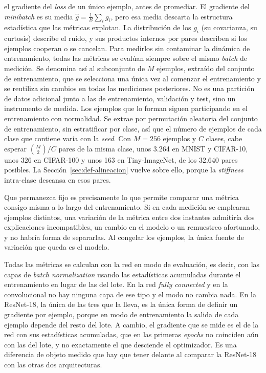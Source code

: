 el gradiente del \emph{loss} de un único ejemplo, antes de promediar. El gradiente del \emph{minibatch} es su media $\hat{g} = \tfrac{1}{B}\sum_i g_i$, pero esa media descarta la estructura estadística que las métricas explotan. La distribución de los $g_i$ (su covarianza, su curtosis) describe el ruido, y sus productos internos por pares describen si los ejemplos cooperan o se cancelan. Para medirlos sin contaminar la dinámica de entrenamiento, todas las métricas se evalúan siempre sobre el mismo \emph{batch} de medición. Se denomina así al subconjunto de $M$ ejemplos, extraído del conjunto de entrenamiento, que se selecciona una única vez al comenzar el entrenamiento y se reutiliza sin cambios en todas las mediciones posteriores. No es una partición de datos adicional junto a las de entrenamiento, validación y test, sino un instrumento de medida. Los ejemplos que lo forman siguen participando en el entrenamiento con normalidad. Se extrae por permutación aleatoria del conjunto de entrenamiento, sin estratificar por clase, así que el número de ejemplos de cada clase que contiene varía con la \emph{seed}. Con $M = 256$ ejemplos y $C$ clases, cabe esperar $\binom{M}{2}/C$ pares de la misma clase, unos 3.264 en MNIST y CIFAR-10, unos 326 en CIFAR-100 y unos 163 en Tiny-ImageNet, de los 32.640 pares posibles. La Sección~\ref{sec:def-alineacion} vuelve sobre ello, porque la \emph{stiffness} intra-clase descansa en esos pares.

Que permanezca fijo es precisamente lo que permite comparar una métrica consigo misma a lo largo del entrenamiento. Si en cada medición se emplearan ejemplos distintos, una variación de la métrica entre dos instantes admitiría dos explicaciones incompatibles, un cambio en el modelo o un remuestreo afortunado, y no habría forma de separarlas. Al congelar los ejemplos, la única fuente de variación que queda es el modelo.

Todas las métricas se calculan con la red en modo de evaluación, es decir, con las capas de \emph{batch normalization} usando las estadísticas acumuladas durante el entrenamiento en lugar de las del lote. En la red \emph{fully connected} y en la convolucional no hay ninguna capa de ese tipo y el modo no cambia nada. En la ResNet-18, la única de las tres que la lleva, es la única forma de definir un gradiente por ejemplo, porque en modo de entrenamiento la salida de cada ejemplo depende del resto del lote. A cambio, el gradiente que se mide es el de la red con sus estadísticas acumuladas, que en las primeras \emph{epochs} no coinciden aún con las del lote, y no exactamente el que desciende el optimizador. Es una diferencia de objeto medido que hay que tener delante al comparar la ResNet-18 con las otras dos arquitecturas.

